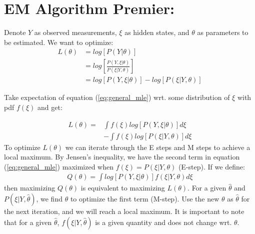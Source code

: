 \documentclass[12pt]{article}
\numberwithin{equation}{section}
\begin{document}
\section{EM Algorithm Premier:} \label{ap:EM_proof}
Denote $Y$ as observed measurements, $\xi$ as hidden states, and $\theta$ as parameters to be estimated. We want to optimize:
\begin{align}
    L(\theta) & = log[P(Y|\theta)] \nonumber \\
    & = log\left[\frac{P(Y,\xi|\theta)}{P(\xi|Y,\theta)}\right] \nonumber \\
    & = log[P(Y,\xi|\theta)] - log[P(\xi|Y,\theta)] \label{eq:general_mle}
\end{align}

Take expectation of equation (\ref{eq:general_mle}) wrt. some distribution of $\xi$ with pdf $f(\xi)$ and get:

\begin{align}
    L(\theta) = & \int f(\xi)log[P(Y,\xi|\theta)]d\xi \nonumber \\
    & - \int f(\xi)log[P(\xi|Y,\theta)]d\xi \nonumber
\end{align}
To optimize $L(\theta)$ we can iterate through the E steps and M steps to achieve a local maximum. By Jensen's inequality, we have the second term in equation (\ref{eq:general_mle}) maximized when $f(\xi)=P(\xi|Y,\theta)$ (E-step). If we define:
\begin{align}
    Q(\theta) = \int log[P(Y,\xi|\theta)]f(\xi|Y,\theta)d\xi \label{eq:Q}
\end{align}
then maximizing $Q(\theta)$ is equivalent to maximizing $ L(\theta)$. For a given $\hat{\theta}$ and $P(\xi|Y, \hat{\theta})$, we find $\theta$ to optimize the first term (M-step). Use the new $\theta$ as $\hat{\theta}$ for the next iteration, and we will reach a local maximum. It is important to note that for a given $\hat{\theta}$, $f(\xi|Y, \hat{\theta})$ is a given quantity and does not change wrt. $\theta$. 
\end{document}
